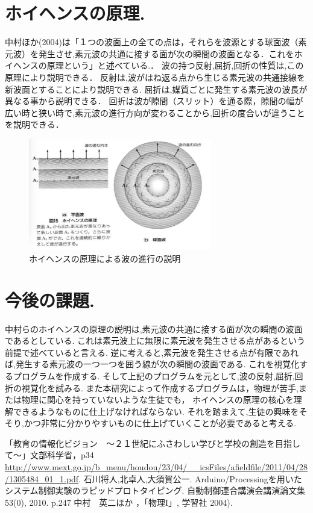 \documentclass[a4j,twocolumn,uplatex]{jarticle}
\begin{document}
\section{ホイヘンスの原理.}
中村ほか(2004)は「１つの波面上の全ての点は，それらを波源とする球面波（素元波）を発生させ,素元波の共通に接する面が次の瞬間の波面となる．これをホイヘンスの原理という」と述べている.\cite{kyoukasyo}．
波の持つ反射,屈折,回折の性質は,この原理により説明できる．
反射は,波がはね返る点から生じる素元波の共通接線を新波面とすることにより説明できる.
屈折は,媒質ごとに発生する素元波の波長が異なる事から説明できる．
回折は波が隙間（スリット）を通る際，隙間の幅が広い時と狭い時で,素元波の進行方向が変わることから,回折の度合いが違うことを説明できる．
\begin{figure}[h]
\begin{center}
   \includegraphics[width=80mm]{./hoihens_1.png} 
   \caption{ホイヘンスの原理による波の進行の説明}
  \label{fig:one}
\end{center}
\end{figure}
\vspace{-10mm}
\section{今後の課題.}
中村らのホイヘンスの原理の説明は,素元波の共通に接する面が次の瞬間の波面であるとしている.
これは素元波上に無限に素元波を発生させる点があるという前提で述べていると言える.
逆に考えると,素元波を発生させる点が有限であれば,発生する素元波の一つ一つを囲う線が次の瞬間の波面である.
これを視覚化するプログラムを作成する.
そして上記のプログラムを元として,波の反射,屈折,回折の視覚化を試みる.
また本研究によって作成するプログラムは，物理が苦手,または物理に関心を持っていないような生徒でも，
ホイヘンスの原理の核心を理解できるようなものに仕上げなければならない.
それを踏まえて,生徒の興味をそそり,かつ非常に分かりやすいものに仕上げていくことが必要であると考える.

\vspace{-5mm}
\begin{thebibliography}{9}
「教育の情報化ビジョン　〜２１世紀にふさわしい学びと学校の創造を目指して〜」文部科学省，p34 \url{http://www.mext.go.jp/b_menu/houdou/23/04/__icsFiles/afieldfile/2011/04/28/1305484_01_1.pdf}.
 石川将人,北卓人,大須賀公一. Arduino/Processingを用いたシステム制御実験のラピッドプロトタイピング. 自動制御連合講演会講演論文集 53(0), 2010. p.247 
 中村　英二ほか ，「物理I」, 学習社 2004).


\end{thebibliography}
\end{document}

